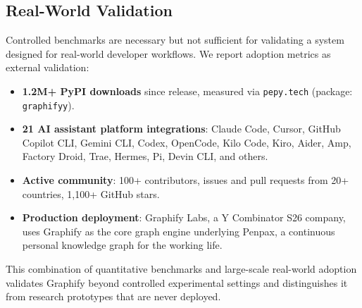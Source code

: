 \subsection{Real-World Validation}

Controlled benchmarks are necessary but not sufficient for validating a
system designed for real-world developer workflows. We report adoption
metrics as external validation:

\begin{itemize}
  \item \textbf{1.2M+ PyPI downloads} since release, measured via
        \texttt{pepy.tech} (package: \texttt{graphifyy}).
  \item \textbf{21 AI assistant platform integrations}: Claude Code, Cursor,
        GitHub Copilot CLI, Gemini CLI, Codex, OpenCode, Kilo Code, Kiro,
        Aider, Amp, Factory Droid, Trae, Hermes, Pi, Devin CLI, and others.
  \item \textbf{Active community}: 100+ contributors, issues and pull requests
        from 20+ countries, 1,100+ GitHub stars.
  \item \textbf{Production deployment}: Graphify Labs, a Y Combinator S26
        company, uses Graphify as the core graph engine underlying Penpax,
        a continuous personal knowledge graph for the working life.
\end{itemize}

This combination of quantitative benchmarks and large-scale real-world
adoption validates Graphify beyond controlled experimental settings and
distinguishes it from research prototypes that are never deployed.
